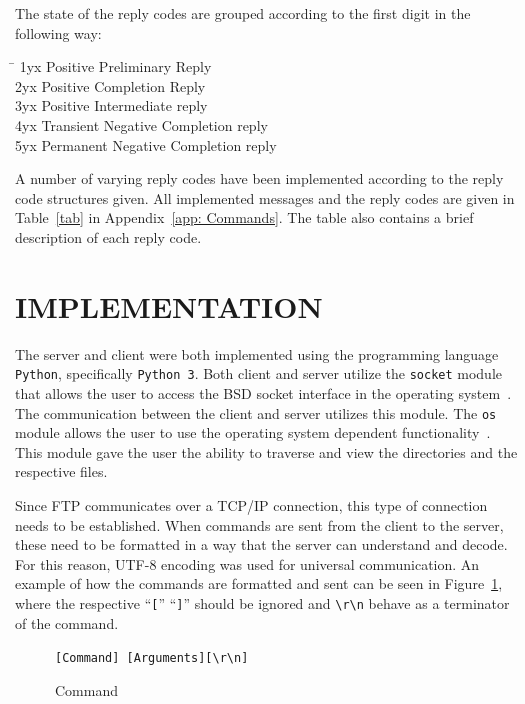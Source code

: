 \documentclass[10pt, conference]{IEEEtran}
\def\code#1{\texttt{#1}}
\begin{document}
The state of the reply codes are grouped according to the first digit in the following way:
\begin{tabbing}
	\hspace{4em}\=\kill
	1yx	\> Positive Preliminary Reply \\ 
	2yx	\> Positive Completion Reply\\ 
	3yx	\> Positive Intermediate reply \\ 
	4yx	\> Transient Negative Completion reply \\ 
	5yx	\> Permanent Negative Completion reply
\end{tabbing} 


A number of varying reply codes have been implemented according to the reply code structures given. All implemented messages and the reply codes are given in Table~\ref{tab} in Appendix~\ref{app: Commands}. The table also contains a brief description of each reply code.

%
\section{IMPLEMENTATION}
\label{sec: Implementation}
The server and client were both implemented using the programming language \code{Python}, specifically \code{Python 3}. Both client and server utilize the \code{socket} module that allows the user to access the BSD socket interface in the operating system~\cite{socket}. The communication between the client and server utilizes this module. The \code{os} module allows the user to use the operating system dependent functionality~\cite{os}. This module gave the user the ability to traverse and view the directories and the respective files.

Since FTP communicates over a TCP/IP connection, this type of connection needs to be established. When commands are sent from the client to the server, these need to be formatted in a way that the server can understand and decode. For this reason, UTF-8 encoding was used for universal communication. An example of how the commands are formatted and sent can be seen in Figure~\ref{fig: Communication}, where the respective ``\code{[}'' ``\code{]}'' should be ignored and \code{\textbackslash r\textbackslash n} behave as a terminator of the command.

\begin{figure}[h!]
\renewcommand{\thefigure}{\arabic{figure}}
\centering
\code{[Command]\ [Arguments][\textbackslash r\textbackslash n]}
\caption{Command}
\label{fig: Communication}
\end{figure}
\end{document}
